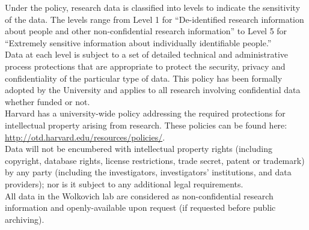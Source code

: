 \documentclass[11pt,a4paper,oneside]{article}
\begin{document}
\noindent Under the policy, research data is classified into levels to indicate the sensitivity of the data.  The levels range from Level 1 for ``De-identified research information about people and other non-confidential research information'' to Level 5 for ``Extremely sensitive information about individually identifiable people.''\\

\noindent Data at each level is subject to a set of detailed technical and administrative process protections that are appropriate to protect the security, privacy and confidentiality of the particular type of data.  This policy has been formally adopted by the University and applies to all research involving confidential data whether funded or not.\\ 

\noindent  Harvard has a university-wide policy addressing the required protections for intellectual property arising from research.  These policies can be found here: \url{http://otd.harvard.edu/resources/policies/}.\\

\noindent Data will not be encumbered with intellectual property rights (including copyright, database rights, license restrictions, trade secret, patent or trademark) by any party (including the investigators, investigators' institutions, and data providers); nor is it subject to any additional legal
requirements.\\

\noindent All data in the Wolkovich lab are considered as non-confidential research information and openly-available upon request (if requested before public archiving). 

% 
\end{document}
